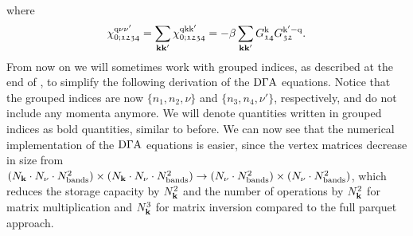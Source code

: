 \documentclass[\main/main.tex]{subfiles}
\begin{document}
where
\begin{align}
	\chi_{0;\mathfrak{1234}}^{\text{q}\nu\nu'}=\sum_{\textbf{kk}'}\chi_{0;\mathfrak{1234}}^{\text{q}\text{k}\text{k}'}=-\beta\sum_{\textbf{kk}'}G^{\text{k}}_{\mathfrak{14}}G^{\text{k}'-\text{q}}_{\mathfrak{32}}.
\end{align}
From now on we will sometimes work with grouped indices, as described at the end of , to simplify the following derivation of the $\text{D}\Gamma\text{A}$ equations. Notice that the grouped indices are now $\{ n_1,n_2,\nu \}$ and $\{ n_3,n_4,\nu' \}$, respectively, and do not include any momenta anymore. We will denote quantities written in grouped indices as bold quantities, similar to before. We can now see that the numerical implementation of the $\text{D}\Gamma\text{A}$ equations is easier, since the vertex matrices decrease in size from $(N_{\textbf{k}}\cdot N_{\nu} \cdot N_{\text{bands}}^2)\times(N_{\textbf{k}}\cdot N_{\nu} \cdot N_{\text{bands}}^2) \to (N_{\nu} \cdot N_{\text{bands}}^2)\times(N_{\nu} \cdot N_{\text{bands}}^2)$, which reduces the storage capacity by $N_{\textbf{k}}^2$ and the number of operations by $N_{\textbf{k}}^2$ for matrix multiplication and $N_{\textbf{k}}^3$ for matrix inversion compared to the full parquet approach.
\end{document}
